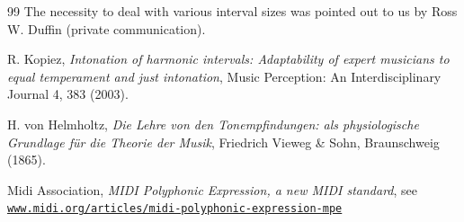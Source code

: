 \documentclass[a4paper,11pt]{iopart}
\begin{document}
\begin{thebibliography}{99}
The necessity to deal with various interval sizes was pointed out to us by Ross W. Duffin (private communication).

R. Kopiez, \textit{Intonation of harmonic intervals: Adaptability of expert musicians to equal temperament and just intonation}, 
Music Perception: An Interdisciplinary Journal 4, 383 (2003).

H. von Helmholtz, \textit{Die Lehre von den Tonempfindungen: als physiologische Grundlage für die Theorie der Musik}, Friedrich Vieweg \& Sohn, Braunschweig (1865).

Midi Association, \textit{MIDI Polyphonic Expression, a new MIDI standard}, see \href{https://www.midi.org/articles/midi-polyphonic-expression-mpe0}{\tt www.midi.org/articles/midi-polyphonic-expression-mpe}

\end{thebibliography}
\end{document}
